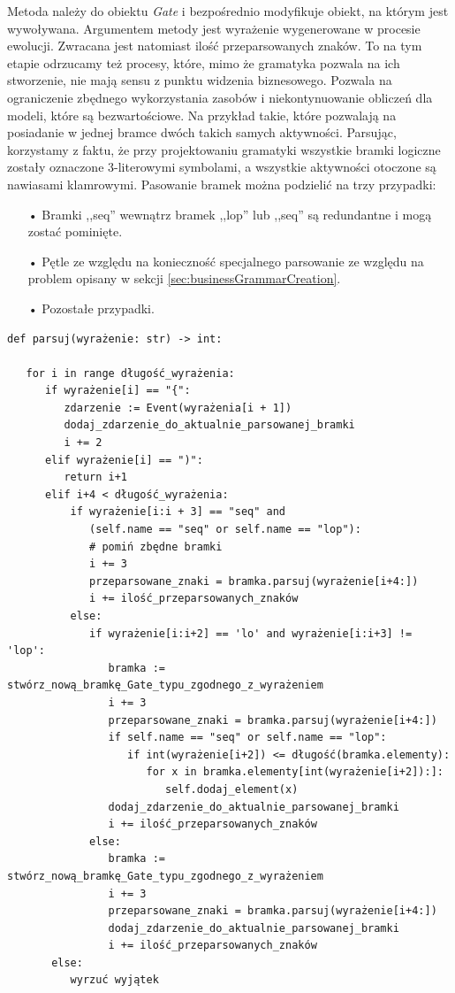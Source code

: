 Metoda należy do obiektu \textit{Gate} i bezpośrednio modyfikuje obiekt, na którym jest wywoływana. Argumentem metody jest wyrażenie wygenerowane w procesie ewolucji. Zwracana jest natomiast ilość przeparsowanych znaków. To na tym etapie odrzucamy też procesy, które, mimo że gramatyka pozwala na ich stworzenie, nie mają sensu z punktu widzenia biznesowego. Pozwala na ograniczenie zbędnego wykorzystania zasobów i niekontynuowanie obliczeń dla modeli, które są bezwartościowe. Na przykład takie, które pozwalają na posiadanie w jednej bramce dwóch takich samych aktywności. Parsując, korzystamy z faktu, że przy projektowaniu gramatyki wszystkie bramki logiczne zostały oznaczone 3-literowymi symbolami, a wszystkie aktywności otoczone są nawiasami klamrowymi. Pasowanie bramek można podzielić na trzy przypadki:
\begin{itemize}   
  \item[•] Bramki ,,seq'' wewnątrz bramek ,,lop'' lub ,,seq'' są redundantne i mogą zostać pominięte.
  \item[•] Pętle ze względu na konieczność specjalnego parsowanie ze względu na problem opisany w sekcji \ref{sec:businessGrammarCreation}.
  \item[•] Pozostałe przypadki.
\end{itemize}


\lstset{caption=Parser gramatyki, captionpos=b}
\lstset{label=src:passive, frame=single}
\begin{lstlisting}[escapeinside=``]
def parsuj(wyrażenie: str) -> int:

   for i in range długość_wyrażenia:
      if wyrażenie[i] == "{":
         zdarzenie := Event(wyrażenia[i + 1])
         dodaj_zdarzenie_do_aktualnie_parsowanej_bramki 
         i += 2
      elif wyrażenie[i] == ")":
         return i+1
      elif i+4 < długość_wyrażenia:
          if wyrażenie[i:i + 3] == "seq" and 
             (self.name == "seq" or self.name == "lop"):
             # pomiń zbędne bramki
             i += 3
             przeparsowane_znaki = bramka.parsuj(wyrażenie[i+4:])
             i += ilość_przeparsowanych_znaków
          else:
             if wyrażenie[i:i+2] == 'lo' and wyrażenie[i:i+3] != 'lop':  
                bramka := stwórz_nową_bramkę_Gate_typu_zgodnego_z_wyrażeniem 
                i += 3
                przeparsowane_znaki = bramka.parsuj(wyrażenie[i+4:])
                if self.name == "seq" or self.name == "lop":
                   if int(wyrażenie[i+2]) <= długość(bramka.elementy):
                      for x in bramka.elementy[int(wyrażenie[i+2]):]:
                         self.dodaj_element(x)
                dodaj_zdarzenie_do_aktualnie_parsowanej_bramki 
                i += ilość_przeparsowanych_znaków
             else:
                bramka := stwórz_nową_bramkę_Gate_typu_zgodnego_z_wyrażeniem 
                i += 3
                przeparsowane_znaki = bramka.parsuj(wyrażenie[i+4:])
                dodaj_zdarzenie_do_aktualnie_parsowanej_bramki 
                i += ilość_przeparsowanych_znaków
       else:
          wyrzuć wyjątek
\end{lstlisting}

